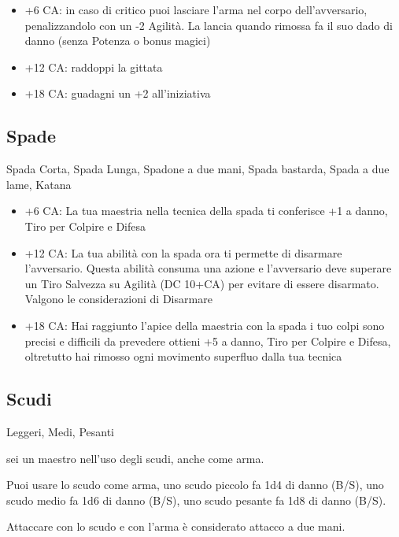 \documentclass[a4paper,11pt,twoside,openany]{book}
\begin{document}
\begin{itemize}

\item +6 CA: in caso di critico puoi lasciare l'arma nel corpo dell'avversario,
penalizzandolo con un -2 Agilità. La lancia quando rimossa fa il suo dado di danno (senza
Potenza o bonus magici)

\item +12 CA: raddoppi la gittata

\item +18 CA: guadagni un +2 all'iniziativa
\end{itemize}

\subsection{Spade} Spada Corta, Spada Lunga, Spadone a due mani, Spada bastarda, Spada a due lame, Katana

\begin{itemize}

\item +6 CA: La tua maestria nella tecnica della spada ti conferisce +1
a danno, Tiro per Colpire e Difesa

\item +12 CA: La tua abilità con la spada ora ti permette di disarmare l'avversario. Questa abilità consuma una azione e l'avversario deve superare un Tiro Salvezza su Agilità (DC 10+CA) per evitare di essere disarmato. Valgono le considerazioni di Disarmare

\item +18 CA: Hai raggiunto l'apice della maestria con la spada i tuo colpi sono precisi e difficili da prevedere ottieni +5 a danno, Tiro per Colpire e Difesa, oltretutto hai rimosso ogni movimento superfluo dalla tua tecnica
\end{itemize}

\subsection{Scudi} Leggeri, Medi, Pesanti

sei un maestro nell'uso degli scudi, anche come arma.

Puoi usare lo scudo come arma, uno scudo piccolo fa 1d4 di danno (B/S), uno scudo medio fa 1d6 di danno (B/S), uno scudo pesante fa 1d8 di danno (B/S).

Attaccare con lo scudo e con l'arma è considerato attacco a due mani.
\end{document}
